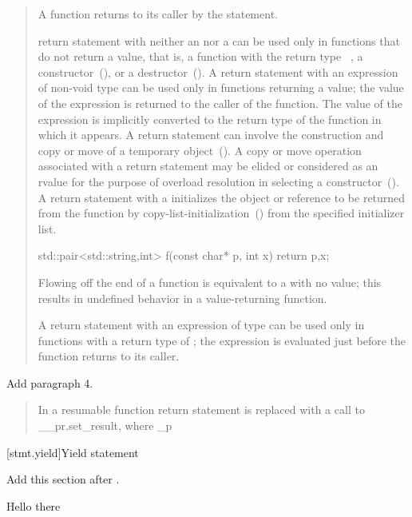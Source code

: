 \begin{quote}
\pnum
A function returns to its caller by the  statement.

\pnum
{} return statement
with neither an  nor a 
can be used only in functions
that do not return a value, that is, a function with the return type
\cv\ , a constructor~(), or a
destructor~().
%
%
A return statement with an expression of non-void type can be used only
in functions returning a value; the value of the expression is returned
to the caller of the function.
%
The value of the expression is implicitly converted to the return type of the
function in which it appears. A return statement can involve the
construction and copy or move of a temporary object~().
\enternote
A copy or move operation associated with a return statement may be elided or
considered as an rvalue for the purpose of overload resolution in
selecting a constructor~().
\exitnote A return statement with a  initializes the object or reference to be returned from the function by copy-list-initialization~() from the specified initializer list. \enterexample

\begin{codeblock}
	std::pair<std::string,int> f(const char* p, int x) {
		return {p,x};
	}
\end{codeblock}
\exitexample

Flowing off the end of a function is equivalent to a  with
no value; this results in undefined behavior in a value-returning
function.

\pnum
A return statement with an expression of type 
can be used only in  functions with a return type of
 
; 
the expression is evaluated just before the function
returns to its caller.
\end{quote}


Add paragraph 4.

\begin{quote}
\setcounter{Paras}{3}
\pnum 
In a resumable function return statement is replaced with
a call to __pr.set_result, where _p
\end{quote}

\setcounter{section}{8}
[stmt.yield]{Yield statement}%

Add this section after .

Hello there


